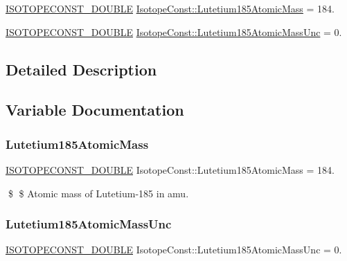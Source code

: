 \begin{DoxyCompactItemize}
\item 
\mbox{\hyperlink{group___isotope_const-_macros_ga8f45a7272ce02c0b4c65c44636ed719a}{I\+S\+O\+T\+O\+P\+E\+C\+O\+N\+S\+T\+\_\+\+D\+O\+U\+B\+LE}} \mbox{\hyperlink{group___isotope_const-_lutetium-_lu185_gafe22a80702f5b25d47c6fbaa0342e431}{Isotope\+Const\+::\+Lutetium185\+Atomic\+Mass}} = 184.
\item 
\mbox{\hyperlink{group___isotope_const-_macros_ga8f45a7272ce02c0b4c65c44636ed719a}{I\+S\+O\+T\+O\+P\+E\+C\+O\+N\+S\+T\+\_\+\+D\+O\+U\+B\+LE}} \mbox{\hyperlink{group___isotope_const-_lutetium-_lu185_gae8729ef4468221eda3631eb12f4afb83}{Isotope\+Const\+::\+Lutetium185\+Atomic\+Mass\+Unc}} = 0.
\end{DoxyCompactItemize}


\subsection{Detailed Description}


\subsection{Variable Documentation}
\mbox{\label{group___isotope_const-_lutetium-_lu185_gafe22a80702f5b25d47c6fbaa0342e431}} 
\subsubsection{\texorpdfstring{Lutetium185\+Atomic\+Mass}{Lutetium185AtomicMass}}
{\footnotesize\ttfamily \mbox{\hyperlink{group___isotope_const-_macros_ga8f45a7272ce02c0b4c65c44636ed719a}{I\+S\+O\+T\+O\+P\+E\+C\+O\+N\+S\+T\+\_\+\+D\+O\+U\+B\+LE}} Isotope\+Const\+::\+Lutetium185\+Atomic\+Mass = 184.}

\$ \$ Atomic mass of Lutetium-\/185 in amu. \mbox{\label{group___isotope_const-_lutetium-_lu185_gae8729ef4468221eda3631eb12f4afb83}} 
\subsubsection{\texorpdfstring{Lutetium185\+Atomic\+Mass\+Unc}{Lutetium185AtomicMassUnc}}
{\footnotesize\ttfamily \mbox{\hyperlink{group___isotope_const-_macros_ga8f45a7272ce02c0b4c65c44636ed719a}{I\+S\+O\+T\+O\+P\+E\+C\+O\+N\+S\+T\+\_\+\+D\+O\+U\+B\+LE}} Isotope\+Const\+::\+Lutetium185\+Atomic\+Mass\+Unc = 0.}

